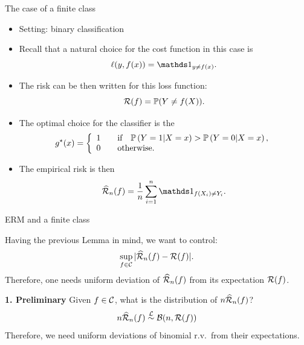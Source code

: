 \documentclass[xcolor={usenames,dvipsnames},handout]{beamer}
\begin{document}
\begin{frame}{The case of a finite class}

\begin{itemize}
\item Setting: binary classification
\item Recall that a natural choice for 
the cost function in this case is
\pause
$$
\ell(y,f(x)) = \one_{y\neq f(x)}.
$$
\item  The risk can be then written for this loss function:
\pause
$$
{\mathcal{R}}(f) = \mathbb{P}(Y\neq f(X)).
$$
\item The optimal choice for the classifier is the 
\pause
$$
g^{\star}(x) =
\left\{
	\begin{array}{cc}
		1 &\quad \text{if} \quad \P \left( Y=1 | X=x \right) > \P \left( Y=0 | X=x \right), \\
		0 &\quad \text{otherwise}. \hfill
	\end{array}
\right.
$$
\item The empirical risk is then
$$
\widehat{\Rc}_n(f) = \frac{1}{n} \sum_{i=1}^n \one_{f(X_i) \neq Y_i}.
$$
\end{itemize}
\end{frame}




\begin{frame}{ERM and a finite class}

Having the previous Lemma in mind, we want to control:
$$\sup_{f\in \mathcal{C}} | \widehat{{\mathcal{R}}}_n(f) - {\mathcal{R}}(f) |.$$
Therefore, one needs uniform deviation of $\widehat{{\mathcal{R}}}_n(f)$ from its expectation ${\mathcal{R}}(f)$.

\textbf{1. Preliminary} Given $f\in \mathcal{C}$, what is the distribution of $n \widehat{{\mathcal{R}}}_n(f)$?
$$
n \widehat{{\mathcal{R}}}_n(f) \overset{{\mathcal{L}}}{\sim} {\mathcal{B}} (n, {\mathcal{R}}(f) )
$$
Therefore, we need uniform deviations of binomial r.v.\ from their expectations.
\end{frame}
\end{document}
